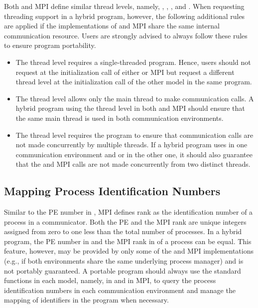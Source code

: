Both \openshmem and MPI define similar thread levels, namely, ,
, , and .
When requesting threading support in a hybrid program, however,
the following additional rules are applied if the implementations of \openshmem
and MPI share the same internal communication resource.
Users are strongly advised to always follow these rules to ensure program
portability.

\begin{itemize}
    \item The  thread level requires a single-threaded program.
    Hence, users should not request  at the initialization
    call of either \openshmem or MPI but request a different thread level at the
    initialization call of the other model in the same program.

    \item The  thread level allows only the main thread to
    make communication calls. A hybrid program using the 
    thread level in both \openshmem and MPI should ensure that the same main thread
    is used in both communication environments.

    \item The  thread level requires the program to ensure
    that communication calls are not made concurrently by multiple threads. If a
    hybrid program uses  in one communication environment
    and  or  in the other one, it
    should also guarantee that the \openshmem and MPI calls are not made concurrently
    from two distinct threads.
\end{itemize}

\subsection{Mapping Process Identification Numbers}
\label{subsec:interoperability:id}

Similar to the PE number in \openshmem, MPI defines rank as the
identification number of a process in a communicator. Both the \openshmem PE
and the MPI rank are unique integers assigned from zero to one less than the total
number of processes. In a hybrid program, the \openshmem
PE number in 
and the MPI rank in  of a process can be equal.
This feature, however, may be provided by only some of the \openshmem and MPI
implementations (e.g., if both environments share the same underlying process
manager) and is not portably guaranteed. A portable program should always
use the standard functions in each model, namely,  in \openshmem
and  in MPI, to query the process identification numbers
in each communication environment and manage the mapping of identifiers in the
program when necessary.

